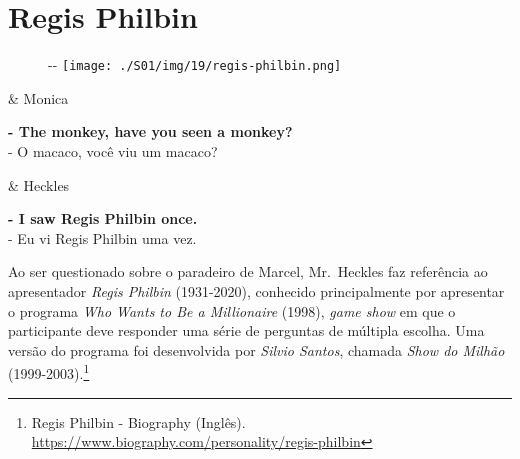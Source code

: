 \hypertarget{regis-philbin}{%
\section{Regis Philbin}\label{regis-philbin}}

\begin{figure}[!ht]
  \begin{adjustwidth}{-\oddsidemargin-1in}{-\rightmargin}
    \centering
    \texttt{[image: ./S01/img/19/regis-philbin.png]}
  \end{adjustwidth}
\end{figure}

\begin{tcolorbox}[enhanced,center upper,
    drop fuzzy shadow southeast, boxrule=0.3pt,
    lower separated=false, breakable,
    colframe=black!30!dialogoBorder,colback=white]
\begin{minipage}[c]{0.16\linewidth}
   & \centering \scriptsize{Monica}
\end{minipage}
\hfill
\begin{minipage}[c]{0.8\linewidth}
  \textbf{- The monkey, have you seen a monkey?}\\
  - O macaco, você viu um macaco?
\end{minipage}

\medskip
\begin{minipage}[c]{0.16\linewidth}
   & \centering \scriptsize{Heckles}
\end{minipage}
\hfill
\begin{minipage}[c]{0.8\linewidth}
  \textbf{- I saw Regis Philbin once.}\\
  - Eu vi Regis Philbin uma vez.
\end{minipage}
\end{tcolorbox}

Ao ser questionado sobre o paradeiro de Marcel, Mr.~Heckles faz
referência ao apresentador \emph{Regis Philbin} (1931-2020), conhecido
principalmente por apresentar o programa \emph{Who Wants to Be a
Millionaire} (1998), \emph{game show} em que o participante deve
responder uma série de perguntas de múltipla escolha. Uma versão do
programa foi desenvolvida por \emph{Silvio Santos}, chamada \emph{Show
do Milhão} (1999-2003).\footnote{\sloppy Regis Philbin - Biography (Inglês). \url{https://www.biography.com/personality/regis-philbin}}

